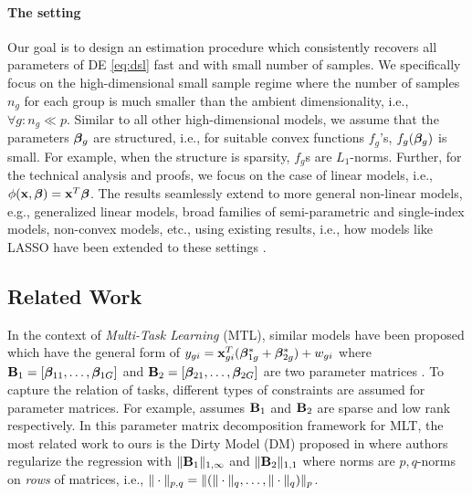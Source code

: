 \paragraph{The setting} Our goal is to design an estimation procedure which consistently recovers all parameters of DE \eqref{eq:dsl} fast and with small number of samples.
We specifically focus on the high-dimensional small sample regime where the number of samples $n_g$ for each group is much smaller than the ambient 
dimensionality, i.e., $\forall g: n_g \ll p$. Similar to all other high-dimensional models, we assume that the parameters $\boldsymbol{\beta}_g$ are structured, i.e., for suitable convex functions $f_g$'s, $f_g(\boldsymbol{\beta}_g)$ is small.
For example, when the structure is sparsity, $f_g$s are $L_1$-norms. Further, for the technical analysis and proofs,
we focus on the case of linear models, i.e., $\phi(\mathbf{x},\boldsymbol{\beta}) = \mathbf{x}^T \boldsymbol{\beta}$. The results
seamlessly extend to more general non-linear models, e.g., generalized linear models, broad families of semi-parametric and single-index models, non-convex models, etc., using
existing results, i.e., how models like LASSO have been extended to these settings \cite{negahban2012restricted}. %


\subsection{Related Work}
In the context of \emph{Multi-Task Learning} (MTL), similar models have been proposed which have the general form of $y_{gi} = \mathbf{x}_{gi}^T (\boldsymbol{\beta}_{1g}^* + \boldsymbol{\beta}^*_{2g}) + w_{gi}$ where $\mathbf{B}_1 = [\boldsymbol{\beta}_{11}, \dots, \boldsymbol{\beta}_{1G}]$ and $\mathbf{B}_2 = [\boldsymbol{\beta}_{21}, \dots, \boldsymbol{\beta}_{2G}]$ are two parameter matrices \cite{Zhang2017-rm}. To capture the relation of tasks, different types of constraints are assumed for parameter matrices. For example, \cite{Chen2012-fb} assumes $\mathbf{B}_1$ and $\mathbf{B}_2$ are sparse and low rank respectively. In this parameter matrix decomposition framework for MLT, the most related work to ours is the Dirty Model (DM) proposed in \cite{jrsr10} where authors regularize the regression with $\|\mathbf{B}_1\|_{1, \infty}$ and $\|\mathbf{B}_2\|_{1,1}$ where norms are $p,q$-norms on \emph{rows} of matrices, i.e., $\|\cdot\|_{p,q} = \|(\|\cdot\|_{q}, \dots, \|\cdot\|_{q})\|_{p}$. 

